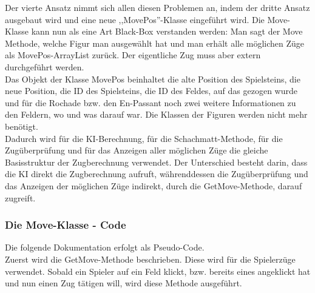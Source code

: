 \documentclass[12pt,a4paper]{article}
\begin{document}
Der vierte Ansatz nimmt sich allen diesen Problemen an, indem der dritte Ansatz ausgebaut wird und eine neue ,,MovePos''-Klasse eingeführt wird. Die Move-Klasse kann nun als eine Art Black-Box verstanden werden: Man sagt der Move Methode, welche Figur man ausgewählt hat und man erhält alle möglichen Züge als MovePos-ArrayList zurück. Der eigentliche Zug muss aber extern durchgeführt werden. \\
Das Objekt der Klasse MovePos beinhaltet die alte Position des Spielsteins, die neue Position, die ID des Spielsteins, die ID des Feldes, auf das gezogen wurde und für die Rochade bzw. den En-Passant noch zwei weitere Informationen zu den Feldern, wo und was darauf war. Die Klassen der Figuren werden nicht mehr benötigt. \\
Dadurch wird für die KI-Berechnung, für die Schachmatt-Methode, für die Zugüberprüfung und für das Anzeigen aller möglichen Züge die gleiche Basisstruktur der Zugberechnung verwendet. Der Unterschied besteht darin, dass die KI direkt die Zugberechnung aufruft, währenddessen die Zugüberprüfung und das Anzeigen der möglichen Züge indirekt, durch die GetMove-Methode, darauf zugreift.\\

\newpage
\subsubsection{Die Move-Klasse - Code}
\label{SUBSUBSEC:MOVECODE}

Die folgende Dokumentation erfolgt als Pseudo-Code. \\
Zuerst wird die GetMove-Methode beschrieben. Diese wird für die Spielerzüge verwendet. Sobald ein Spieler auf ein Feld klickt, bzw. bereits eines angeklickt hat und nun einen Zug tätigen will, wird diese Methode ausgeführt. \\
\end{document}
